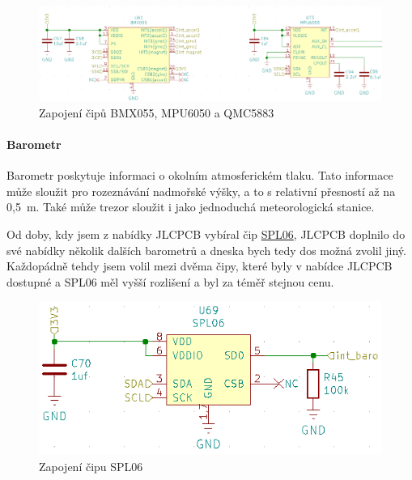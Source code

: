 \begin{figure}[htbp]
    \centering
    \includegraphics[width=\textwidth]{kapitoly/obrazky/E4/vnimani/BMX-MPU.png}
    \caption{Zapojení čipů BMX055, MPU6050 a QMC5883}
    \label{fig:E4-9axis}
\end{figure}

\newpage

\paragraph{Barometr}
Barometr poskytuje informaci o okolním atmosferickém tlaku. Tato informace může sloužit pro rozeznávání nadmořské výšky, a to s relativní přesností až na 0,5~m. Také může trezor sloužit 
i jako jednoduchá meteorologická stanice.

Od doby, kdy jsem z nabídky JLCPCB vybíral čip \href{https://datasheet.lcsc.com/szlcsc/1907081118_Goertek-SPL06-007_C233787.pdf}{SPL06}, 
JLCPCB doplnilo do své nabídky několik dalších barometrů a dneska bych tedy dos možná zvolil jiný. Každopádně tehdy jsem volil 
mezi dvěma čipy, které byly v nabídce JLCPCB dostupné a SPL06 měl vyšší rozlišení a byl za téměř stejnou cenu.

\begin{figure}[htbp]
    \centering
    \includegraphics[width=\textwidth]{kapitoly/obrazky/E4/vnimani/SPL06.png}
    \caption{Zapojení čipu SPL06}
    \label{fig:E4-SPL06}
\end{figure}

\newpage

